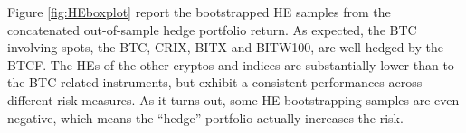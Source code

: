 Figure \ref{fig:HEboxplot} report the bootstrapped HE samples from the
concatenated out-of-sample hedge portfolio return. As expected, the
BTC involving spots, the BTC, CRIX, BITX and BITW100, are well hedged
by the BTCF.  The HEs of the other cryptos and indices are
substantially lower than to the BTC-related instruments, but 
exhibit a consistent performances across different risk measures. 
As it turns out, some HE bootstrapping samples are even negative,
which means the ``hedge'' portfolio actually increases the risk. 







